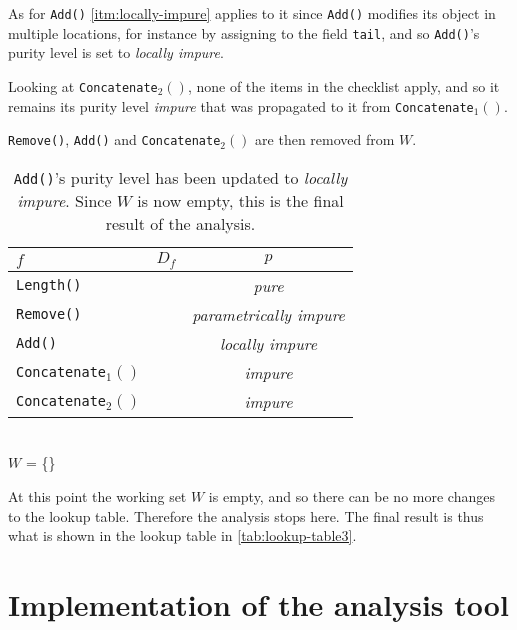 \documentclass[a4paper,12pt]{article}
\begin{document}
As for \texttt{Add()} \autoref{itm:locally-impure} applies to it since \texttt{Add()} modifies its object in multiple locations, for instance by assigning to the field \texttt{tail}, and so \texttt{Add()}'s purity level is set to \textit{locally impure}.

Looking at \texttt{Concatenate$_2()$}, none of the items in the checklist apply, and so it remains its purity level \textit{impure} that was propagated to it from \texttt{Concatenate$_1()$}.

\texttt{Remove()}, \texttt{Add()} and \texttt{Concatenate$_2()$} are then removed from $W$.

\begin{table}[H]
  \caption{\texttt{Add()}'s purity level has been updated to \textit{locally impure}. Since $W$ is now empty, this is the final result of the analysis.}
  \label{tab:lookup-table3}
  \centering
  \begin{tabular}{|l|c|c|}
    \hline
    $f$                        & $D_f$                  & $p$                            \\ \hline
    \texttt{Length()}          &                        & \textit{pure}                         \\
    \texttt{Remove()}          &                        & \textit{parametrically impure}        \\
    \texttt{Add()}             &                        & \textit{locally impure}               \\
    \texttt{Concatenate$_1()$}  &                        & \textit{impure}                       \\
    \texttt{Concatenate$_2()$}  &                        & \textit{impure}                       \\ \hline
  \end{tabular}
  \\
  $W$ = \{\}
\end{table}

At this point the working set $W$ is empty, and so there can be no more changes to the lookup table. Therefore the analysis stops here. The final result is thus what is shown in the lookup table in \autoref{tab:lookup-table3}.

\section{Implementation of the analysis tool} \label{sec:Implementation of the analysis tool}
\end{document}

